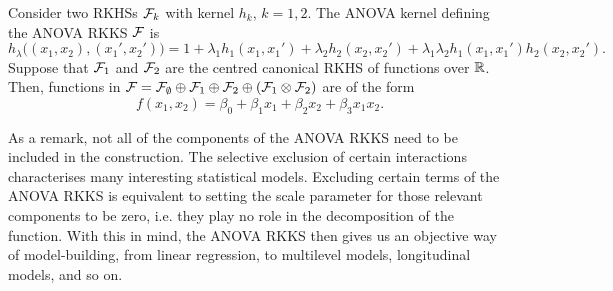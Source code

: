
\begin{example}
  Consider two RKHSs ${\mathcal F}_k$ with kernel $h_k$, $k=1,2$.
  The ANOVA kernel defining the ANOVA RKKS ${\mathcal F}$ is
  \[
    h_\lambda\big((x_1,x_2),(x_1',x_2') \big) = 1 + \lambda_1 h_1(x_1,x_1') + \lambda_2 h_2(x_2,x_2') + \lambda_1\lambda_2 h_1(x_1,x_1')h_2(x_2,x_2').
  \]  
  Suppose that ${\mathcal F}_1$ and ${\mathcal F}_2$ are the centred canonical RKHS of functions over $\mathbb{R}$.
  Then, functions in ${\mathcal F} = {\mathcal F}_\emptyset \oplus {\mathcal F}_1 \oplus {\mathcal F}_2 \oplus ({\mathcal F}_1 \otimes {\mathcal F}_2)$ are of the form
  \[
    f(x_1,x_2) = \beta_0 + \beta_1x_1 + \beta_2x_2 + \beta_3x_1x_2.
  \]
\end{example}

As a remark, not all of the components of the ANOVA RKKS need to be included in the construction.
The selective exclusion of certain interactions characterises many interesting statistical models.
Excluding certain terms of the ANOVA RKKS is equivalent to setting the scale parameter for those relevant components to be zero, i.e. they play no role in the decomposition of the function.
With this in mind, the ANOVA RKKS then gives us an objective way of model-building, from linear regression, to multilevel models, longitudinal models, and so on.

